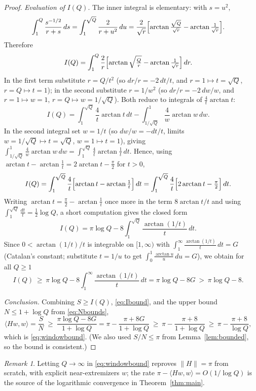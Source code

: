 \documentclass[12pt]{article}
\theoremstyle{remark}
\newtheorem*{remark}{Remark}
\begin{document}
\begin{proof}
\smallskip
\noindent\emph{Evaluation of $I(Q)$.} The inner integral is elementary: with $s=u^2$,
\[
\int_1^{Q}\frac{s^{-1/2}}{r+s}\,ds=\int_1^{\sqrt Q}\frac{2}{r+u^2}\,du
=\frac{2}{\sqrt r}\Bigl[\arctan\tfrac{\sqrt Q}{\sqrt r}-\arctan\tfrac{1}{\sqrt r}\Bigr].
\]
Therefore
\[
I(Q)=\int_1^{Q}\frac{2}{r}\Bigl[\arctan\sqrt{\tfrac Qr}-\arctan\tfrac1{\sqrt r}\Bigr]\,dr .
\]
In the first term substitute $r=Q/t^2$ (so $dr/r=-2\,dt/t$, and $r=1\mapsto t=\sqrt Q$,
$r=Q\mapsto t=1$); in the second substitute $r=1/w^2$ (so $dr/r=-2\,dw/w$, and
$r=1\mapsto w=1$, $r=Q\mapsto w=1/\sqrt Q$). Both reduce to integrals of
$\tfrac{4}{t}\arctan t$:
\[
I(Q)=\int_1^{\sqrt Q}\frac4t\arctan t\,dt-\int_{1/\sqrt Q}^{1}\frac4w\arctan w\,dw .
\]
In the second integral set $w=1/t$ (so $dw/w=-dt/t$, limits $w=1/\sqrt Q\mapsto t=\sqrt Q$,
$w=1\mapsto t=1$), giving $\int_{1/\sqrt Q}^1\tfrac4w\arctan w\,dw=\int_1^{\sqrt Q}\tfrac4t
\arctan\tfrac1t\,dt$. Hence, using $\arctan t-\arctan\tfrac1t=2\arctan t-\tfrac\pi2$ for $t>0$,
\[
I(Q)=\int_1^{\sqrt Q}\frac4t\Bigl[\arctan t-\arctan\tfrac1t\Bigr]\,dt
=\int_1^{\sqrt Q}\frac4t\Bigl[2\arctan t-\tfrac\pi2\Bigr]\,dt .
\]
Writing $\arctan t=\tfrac\pi2-\arctan\tfrac1t$ once more in the term $8\arctan t/t$ and using
$\int_1^{\sqrt Q}\tfrac{dt}{t}=\tfrac12\log Q$, a short computation gives the closed form
\begin{equation}\label{eq:Iclosed}
I(Q)=\pi\log Q-8\int_1^{\sqrt Q}\frac{\arctan(1/t)}{t}\,dt .
\end{equation}
Since $0<\arctan(1/t)/t$ is integrable on $[1,\infty)$ with
$\int_1^{\infty}\frac{\arctan(1/t)}{t}\,dt=G$ (Catalan's constant; substitute $t=1/u$ to get
$\int_0^1\frac{\arctan u}{u}\,du=G$), we obtain for all $Q\ge1$
\begin{equation}\label{eq:Ibound}
I(Q)\ \ge\ \pi\log Q-8\int_1^{\infty}\frac{\arctan(1/t)}{t}\,dt=\pi\log Q-8G\ >\ \pi\log Q-8 .
\end{equation}

\smallskip
\noindent\emph{Conclusion.} Combining $S\ge I(Q)$, \eqref{eq:Ibound}, and the upper bound
$N\le1+\log Q$ from \eqref{eq:Nbounds},
\[
\langle Hw,w\rangle=\frac SN\ \ge\ \frac{\pi\log Q-8G}{1+\log Q}
=\pi-\frac{\pi+8G}{1+\log Q}\ \ge\ \pi-\frac{\pi+8}{1+\log Q}\ \ge\ \pi-\frac{\pi+8}{\log Q},
\]
which is \eqref{eq:windowbound}. (We also used $S/N\le\pi$ from Lemma~\ref{lem:bounded}, so the
bound is consistent.)
\end{proof}

\begin{remark}
Letting $Q\to\infty$ in \eqref{eq:windowbound} reproves $\|H\|=\pi$ from scratch, with explicit
near-extremizers $w$; the rate $\pi-\langle Hw,w\rangle=O(1/\log Q)$ is the source of the
logarithmic convergence in Theorem~\ref{thm:main}.
\end{remark}
\end{document}
